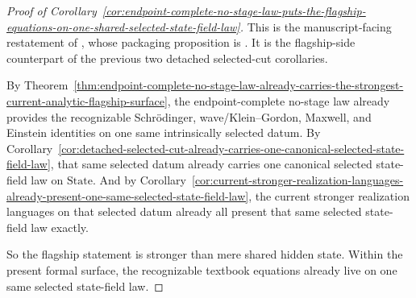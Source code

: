 \begin{proof}[Proof of Corollary~\ref{cor:endpoint-complete-no-stage-law-puts-the-flagship-equations-on-one-shared-selected-state-field-law}]
\label{proof:cor:endpoint-complete-no-stage-law-puts-the-flagship-equations-on-one-shared-selected-state-field-law}
This is the manuscript-facing restatement of
,
whose packaging proposition is
. It is the flagship-side
counterpart of the previous two detached selected-cut corollaries.

By Theorem~\ref{thm:endpoint-complete-no-stage-law-already-carries-the-strongest-current-analytic-flagship-surface},
the endpoint-complete no-stage law already provides the recognizable
Schr\"odinger, wave/Klein--Gordon, Maxwell, and Einstein identities on one same
intrinsically selected datum. By
Corollary~\ref{cor:detached-selected-cut-already-carries-one-canonical-selected-state-field-law},
that same selected datum already carries one canonical selected state-field law
on \(\mathrm{State}\). And by
Corollary~\ref{cor:current-stronger-realization-languages-already-present-one-same-selected-state-field-law},
the current stronger realization languages on that selected datum already all
present that same selected state-field law exactly.

So the flagship statement is stronger than mere shared hidden state. Within the
present formal surface, the recognizable textbook equations already live on one
same selected state-field law.
\end{proof}

